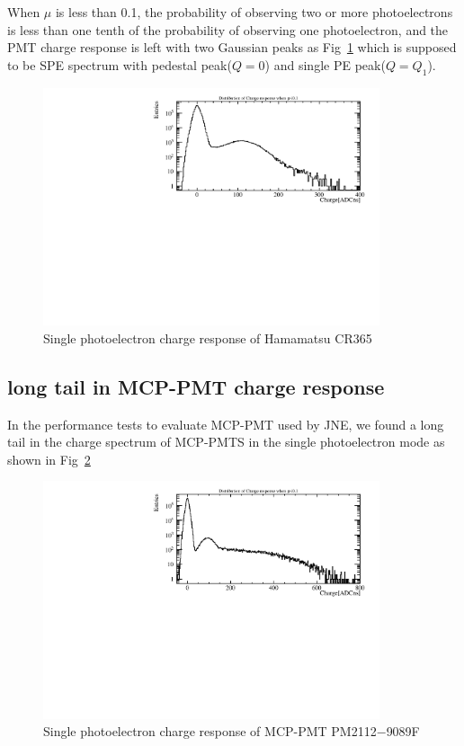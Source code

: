 \documentclass{article}
\begin{document}
When $\mu$ is less than 0.1, the probability of observing two or more photoelectrons is less than one tenth of the probability
of observing one photoelectron, and the PMT charge response is left with two Gaussian peaks as Fig~\ref{fig:spe_sreal}
which is supposed to be SPE spectrum with pedestal peak($Q=0$) and single PE peak($Q=Q_1$)\cite{Xia_2015}.
\begin{figure}[ht]
    \centering
    \includegraphics[height=7cm]{pic/siglepe.pdf}
    \caption{Single photoelectron charge response of Hamamatsu CR365}\label{fig:spe_sreal}
\end{figure}
\subsection{long tail in MCP-PMT charge response}\label{subsec:tail}
In the performance tests to evaluate MCP-PMT used by JNE, we found a long tail in the charge spectrum of MCP-PMTS in the single photoelectron mode as shown in Fig~\ref{fig:tail}
\begin{figure}[ht]
    \centering
    \includegraphics[height=7cm]{pic/longtail.pdf}
    \caption{Single photoelectron charge response of MCP-PMT PM2112$-$9089F}\label{fig:tail}
\end{figure}
\end{document}
